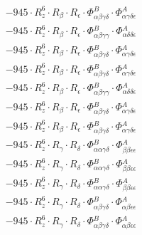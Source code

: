 \documentclass{article}
\begin{document}
\begin{subequations}
\begin{gather}
\begin{array}{c}
 \\[0.2em] 		 - 945 \cdot R_{z}^{6} \cdot R_{\beta{}} \cdot R_{\epsilon{}} \cdot \Phi{}^{B}_{\alpha{}\beta{}\gamma{}\delta{}} \cdot \Phi{}^{A}_{\alpha{}\gamma{}\delta{}\epsilon{}} 
 \\[0.2em] 		 - 945 \cdot R_{z}^{6} \cdot R_{\beta{}} \cdot R_{\epsilon{}} \cdot \Phi{}^{B}_{\alpha{}\beta{}\gamma{}\gamma{}} \cdot \Phi{}^{A}_{\alpha{}\delta{}\delta{}\epsilon{}} 
 \\[0.2em] 		 - 945 \cdot R_{z}^{6} \cdot R_{\beta{}} \cdot R_{\epsilon{}} \cdot \Phi{}^{B}_{\alpha{}\beta{}\gamma{}\delta{}} \cdot \Phi{}^{A}_{\alpha{}\gamma{}\delta{}\epsilon{}} 
 \\[0.2em] 		 - 945 \cdot R_{z}^{6} \cdot R_{\beta{}} \cdot R_{\epsilon{}} \cdot \Phi{}^{B}_{\alpha{}\beta{}\gamma{}\delta{}} \cdot \Phi{}^{A}_{\alpha{}\gamma{}\delta{}\epsilon{}} 
 \\[0.2em] 		 - 945 \cdot R_{z}^{6} \cdot R_{\beta{}} \cdot R_{\epsilon{}} \cdot \Phi{}^{B}_{\alpha{}\beta{}\gamma{}\gamma{}} \cdot \Phi{}^{A}_{\alpha{}\delta{}\delta{}\epsilon{}} 
 \\[0.2em] 		 - 945 \cdot R_{z}^{6} \cdot R_{\beta{}} \cdot R_{\epsilon{}} \cdot \Phi{}^{B}_{\alpha{}\beta{}\gamma{}\delta{}} \cdot \Phi{}^{A}_{\alpha{}\gamma{}\delta{}\epsilon{}} 
 \\[0.2em] 		 - 945 \cdot R_{z}^{6} \cdot R_{\beta{}} \cdot R_{\epsilon{}} \cdot \Phi{}^{B}_{\alpha{}\beta{}\gamma{}\delta{}} \cdot \Phi{}^{A}_{\alpha{}\gamma{}\delta{}\epsilon{}} 
 \\[0.2em] 		 - 945 \cdot R_{z}^{6} \cdot R_{\gamma{}} \cdot R_{\delta{}} \cdot \Phi{}^{B}_{\alpha{}\alpha{}\gamma{}\delta{}} \cdot \Phi{}^{A}_{\beta{}\beta{}\epsilon{}\epsilon{}} 
 \\[0.2em] 		 - 945 \cdot R_{z}^{6} \cdot R_{\gamma{}} \cdot R_{\delta{}} \cdot \Phi{}^{B}_{\alpha{}\alpha{}\gamma{}\delta{}} \cdot \Phi{}^{A}_{\beta{}\beta{}\epsilon{}\epsilon{}} 
 \\[0.2em] 		 - 945 \cdot R_{z}^{6} \cdot R_{\gamma{}} \cdot R_{\delta{}} \cdot \Phi{}^{B}_{\alpha{}\alpha{}\gamma{}\delta{}} \cdot \Phi{}^{A}_{\beta{}\beta{}\epsilon{}\epsilon{}} 
 \\[0.2em] 		 - 945 \cdot R_{z}^{6} \cdot R_{\gamma{}} \cdot R_{\delta{}} \cdot \Phi{}^{B}_{\alpha{}\beta{}\gamma{}\delta{}} \cdot \Phi{}^{A}_{\alpha{}\beta{}\epsilon{}\epsilon{}} 
 \\[0.2em] 		 - 945 \cdot R_{z}^{6} \cdot R_{\gamma{}} \cdot R_{\delta{}} \cdot \Phi{}^{B}_{\alpha{}\beta{}\gamma{}\delta{}} \cdot \Phi{}^{A}_{\alpha{}\beta{}\epsilon{}\epsilon{}} 

\end{array}
\end{gather}
\end{subequations}
\end{document}
